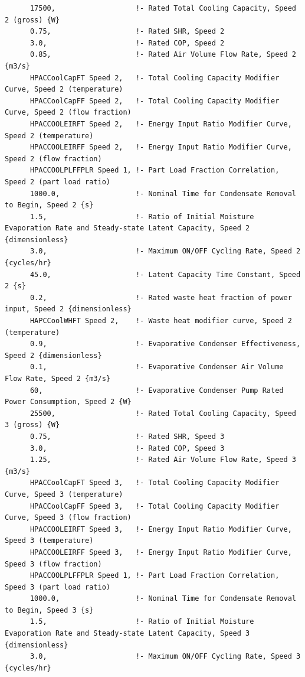 \begin{lstlisting}
      17500,                   !- Rated Total Cooling Capacity, Speed 2 (gross) {W}
      0.75,                    !- Rated SHR, Speed 2
      3.0,                     !- Rated COP, Speed 2
      0.85,                    !- Rated Air Volume Flow Rate, Speed 2 {m3/s}
      HPACCoolCapFT Speed 2,   !- Total Cooling Capacity Modifier Curve, Speed 2 (temperature)
      HPACCoolCapFF Speed 2,   !- Total Cooling Capacity Modifier Curve, Speed 2 (flow fraction)
      HPACCOOLEIRFT Speed 2,   !- Energy Input Ratio Modifier Curve, Speed 2 (temperature)
      HPACCOOLEIRFF Speed 2,   !- Energy Input Ratio Modifier Curve, Speed 2 (flow fraction)
      HPACCOOLPLFFPLR Speed 1, !- Part Load Fraction Correlation, Speed 2 (part load ratio)
      1000.0,                  !- Nominal Time for Condensate Removal to Begin, Speed 2 {s}
      1.5,                     !- Ratio of Initial Moisture Evaporation Rate and Steady-state Latent Capacity, Speed 2 {dimensionless}
      3.0,                     !- Maximum ON/OFF Cycling Rate, Speed 2 {cycles/hr}
      45.0,                    !- Latent Capacity Time Constant, Speed 2 {s}
      0.2,                     !- Rated waste heat fraction of power input, Speed 2 {dimensionless}
      HAPCCoolWHFT Speed 2,    !- Waste heat modifier curve, Speed 2 (temperature)
      0.9,                     !- Evaporative Condenser Effectiveness, Speed 2 {dimensionless}
      0.1,                     !- Evaporative Condenser Air Volume Flow Rate, Speed 2 {m3/s}
      60,                      !- Evaporative Condenser Pump Rated Power Consumption, Speed 2 {W}
      25500,                   !- Rated Total Cooling Capacity, Speed 3 (gross) {W}
      0.75,                    !- Rated SHR, Speed 3
      3.0,                     !- Rated COP, Speed 3
      1.25,                    !- Rated Air Volume Flow Rate, Speed 3 {m3/s}
      HPACCoolCapFT Speed 3,   !- Total Cooling Capacity Modifier Curve, Speed 3 (temperature)
      HPACCoolCapFF Speed 3,   !- Total Cooling Capacity Modifier Curve, Speed 3 (flow fraction)
      HPACCOOLEIRFT Speed 3,   !- Energy Input Ratio Modifier Curve, Speed 3 (temperature)
      HPACCOOLEIRFF Speed 3,   !- Energy Input Ratio Modifier Curve, Speed 3 (flow fraction)
      HPACCOOLPLFFPLR Speed 1, !- Part Load Fraction Correlation, Speed 3 (part load ratio)
      1000.0,                  !- Nominal Time for Condensate Removal to Begin, Speed 3 {s}
      1.5,                     !- Ratio of Initial Moisture Evaporation Rate and Steady-state Latent Capacity, Speed 3 {dimensionless}
      3.0,                     !- Maximum ON/OFF Cycling Rate, Speed 3 {cycles/hr}

\end{lstlisting}
